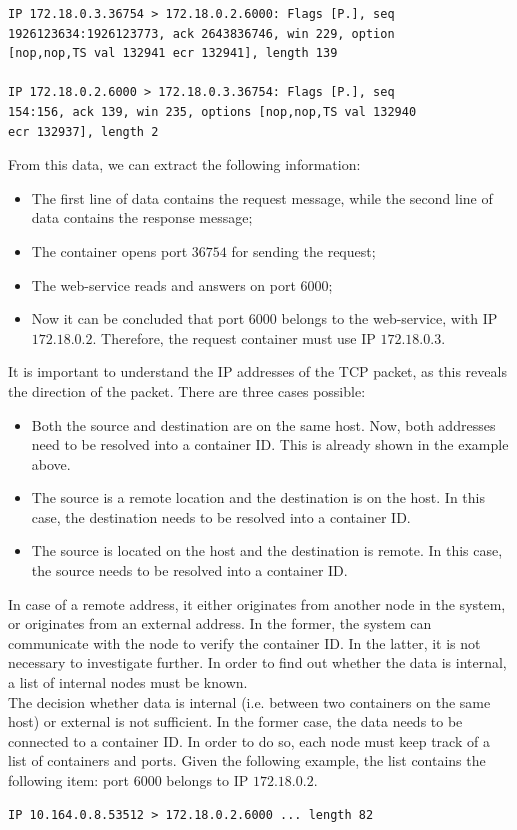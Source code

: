 \begin{verbatim}
IP 172.18.0.3.36754 > 172.18.0.2.6000: Flags [P.], seq
1926123634:1926123773, ack 2643836746, win 229, option
[nop,nop,TS val 132941 ecr 132941], length 139

IP 172.18.0.2.6000 > 172.18.0.3.36754: Flags [P.], seq
154:156, ack 139, win 235, options [nop,nop,TS val 132940 
ecr 132937], length 2
\end{verbatim}
From this data, we can extract the following information:
\begin{itemize}
    \item The first line of data contains the request message, while the second line of data contains the response message;    
    \item The container opens port $36754$ for sending the request;
    \item The web-service reads and answers on port $6000$;
    \item Now it can be concluded that port $6000$ belongs to the web-service, with IP $172.18.0.2$. Therefore, the request container must use IP $172.18.0.3$.
\end{itemize}
It is important to understand the IP addresses of the TCP packet, as this reveals the direction of the packet. There are three cases possible:
\begin{itemize}
    \item Both the source and destination are on the same host. Now, both addresses need to be resolved into a container ID. This is already shown in the example above.
    \item The source is a remote location and the destination is on the host. In this case, the destination needs to be resolved into a container ID.
    \item The source is located on the host and the destination is remote. In this case, the source needs to be resolved into a container ID.
\end{itemize}

\noindent
In case of a remote address, it either originates from another node in the system, or originates from an external address. In the former, the system can communicate with the node to verify the container ID. In the latter, it is not necessary to investigate further. In order to find out whether the data is internal, a list of internal nodes must be known.\\

\noindent
The decision whether data is internal (i.e. between two containers on the same host) or external is not sufficient. In the former case, the data needs to be connected to a container ID. In order to do so, each node must keep track of a list of containers and ports. Given the following example, the list contains the following item: port $6000$ belongs to IP $172.18.0.2$.
\begin{verbatim}
IP 10.164.0.8.53512 > 172.18.0.2.6000 ... length 82
\end{verbatim}

